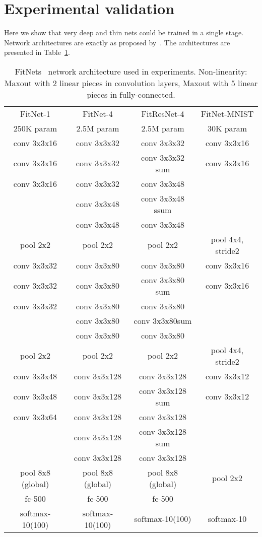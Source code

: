 \documentclass{article} \clearpage{}\usepackage{iclr2016_conference,times}
\begin{document}
\section{Experimental validation}
\label{sec:experiment}
Here we show that very deep and thin nets could be trained in a single stage. Network architectures are exactly as proposed by~\cite{FitNets2014}. The architectures are presented in Table~\ref{tab:fitnet-architectures}.
\begin{table}[htb]
\caption{ FitNets~\cite{FitNets2014} network architecture used in experiments. Non-linearity: Maxout with 2 linear pieces in convolution layers, Maxout with 5 linear pieces in fully-connected.}
\label{tab:fitnet-architectures}
\centering
\setlength{\tabcolsep}{.3em}
\begin{tabular}{|c|c|c|c|}
\hline
FitNet-1 & FitNet-4 & FitResNet-4& FitNet-MNIST\\
250K param & 2.5M param &  2.5M param & 30K param\\
\hline
conv 3x3x16 & conv 3x3x32 & conv 3x3x32 & conv 3x3x16 \\
conv 3x3x16 & conv 3x3x32 & conv 3x3x32 sum & conv 3x3x16 \\
conv 3x3x16 & conv 3x3x32 & conv 3x3x48 & \\
&  conv 3x3x48&  conv 3x3x48 ssum &  \\
&  conv 3x3x48&  conv 3x3x48 &  \\
pool 2x2&  pool 2x2 & pool 2x2 & pool 4x4, stride2 \\
\hline
conv 3x3x32 & conv 3x3x80 & conv 3x3x80 & conv 3x3x16 \\
conv 3x3x32 & conv 3x3x80 & conv 3x3x80 sum  & conv 3x3x16 \\
conv 3x3x32 & conv 3x3x80& conv 3x3x80 &  \\
&  conv 3x3x80& conv 3x3x80sum &  \\
&  conv 3x3x80& conv 3x3x80  &  \\
pool 2x2&  pool 2x2 & pool 2x2 & pool 4x4, stride2 \\
\hline
conv 3x3x48 & conv 3x3x128 & conv 3x3x128 & conv 3x3x12 \\
conv 3x3x48 & conv 3x3x128 & conv 3x3x128 sum& conv 3x3x12 \\
conv 3x3x64 & conv 3x3x128& conv 3x3x128  & \\
&  conv 3x3x128& conv 3x3x128 sum &  \\
&  conv 3x3x128 & conv 3x3x128 & \\
pool 8x8 (global)&  pool 8x8 (global) &pool 8x8 (global) & pool 2x2 \\
\hline
fc-500&  fc-500 &fc-500&   \\
softmax-10(100) & softmax-10(100) & softmax-10(100) & softmax-10\\
\hline
\end{tabular}
\end{table}
\end{document}
